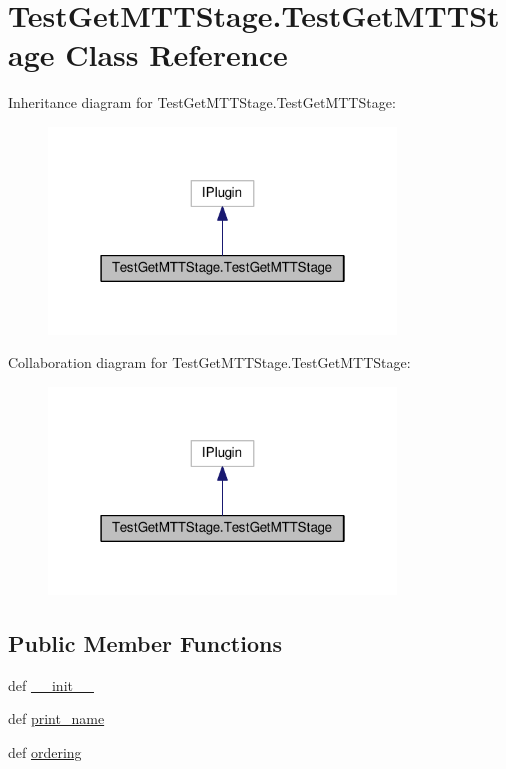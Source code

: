\hypertarget{class_test_get_m_t_t_stage_1_1_test_get_m_t_t_stage}{\section{Test\-Get\-M\-T\-T\-Stage.\-Test\-Get\-M\-T\-T\-Stage Class Reference}
\label{class_test_get_m_t_t_stage_1_1_test_get_m_t_t_stage}
}


Inheritance diagram for Test\-Get\-M\-T\-T\-Stage.\-Test\-Get\-M\-T\-T\-Stage\-:
\nopagebreak
\begin{figure}[H]
\begin{center}
\leavevmode
\includegraphics[width=262pt]{class_test_get_m_t_t_stage_1_1_test_get_m_t_t_stage__inherit__graph}
\end{center}
\end{figure}


Collaboration diagram for Test\-Get\-M\-T\-T\-Stage.\-Test\-Get\-M\-T\-T\-Stage\-:
\nopagebreak
\begin{figure}[H]
\begin{center}
\leavevmode
\includegraphics[width=262pt]{class_test_get_m_t_t_stage_1_1_test_get_m_t_t_stage__coll__graph}
\end{center}
\end{figure}
\subsection*{Public Member Functions}
\begin{DoxyCompactItemize}
\item 
def \hyperlink{class_test_get_m_t_t_stage_1_1_test_get_m_t_t_stage_adcada621115f6b12cdc9b0949da5e969}{\-\_\-\-\_\-init\-\_\-\-\_\-}
\item 
def \hyperlink{class_test_get_m_t_t_stage_1_1_test_get_m_t_t_stage_a6082004f762323aea42aab7c638066de}{print\-\_\-name}
\item 
def \hyperlink{class_test_get_m_t_t_stage_1_1_test_get_m_t_t_stage_a41143acbbabbc2b3990ed1cff8101907}{ordering}
\end{DoxyCompactItemize}



